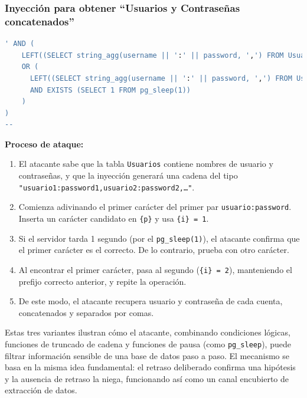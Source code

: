 \documentclass[a4paper,12pt]{article}
\begin{document}
\subsubsection*{Inyección para obtener ``Usuarios y Contraseñas concatenados''}

\begin{lstlisting}[language=SQL]
' AND (
    LEFT((SELECT string_agg(username || ':' || password, ',') FROM Usuarios), {i}) <> '{p}'
    OR (
      LEFT((SELECT string_agg(username || ':' || password, ',') FROM Usuarios), {i}) = '{p}'
      AND EXISTS (SELECT 1 FROM pg_sleep(1))
    )
)
--
\end{lstlisting}

\textbf{Proceso de ataque:}
\begin{enumerate}
    \item El atacante sabe que la tabla \texttt{Usuarios} contiene nombres de usuario y contraseñas, y que la inyección generará una cadena del tipo \texttt{"usuario1:password1,usuario2:password2,\dots"}.
    \item Comienza adivinando el primer carácter del primer par \texttt{usuario:password}. Inserta un carácter candidato en \texttt{\{p\}} y usa \texttt{\{i\} = 1}.
    \item Si el servidor tarda 1 segundo (por el \texttt{pg\_sleep(1)}), el atacante confirma que el primer carácter es el correcto. De lo contrario, prueba con otro carácter.
    \item Al encontrar el primer carácter, pasa al segundo (\texttt{\{i\} = 2}), manteniendo el prefijo correcto anterior, y repite la operación.
    \item De este modo, el atacante recupera usuario y contraseña de cada cuenta, concatenados y separados por comas.
\end{enumerate}

\medskip

Estas tres variantes ilustran cómo el atacante, combinando condiciones lógicas, funciones de truncado de cadena y funciones de pausa (como \texttt{pg\_sleep}), puede filtrar información sensible de una base de datos paso a paso. El mecanismo se basa en la misma idea fundamental: el retraso deliberado confirma una hipótesis y la ausencia de retraso la niega, funcionando así como un canal encubierto de extracción de datos.





\end{document}
